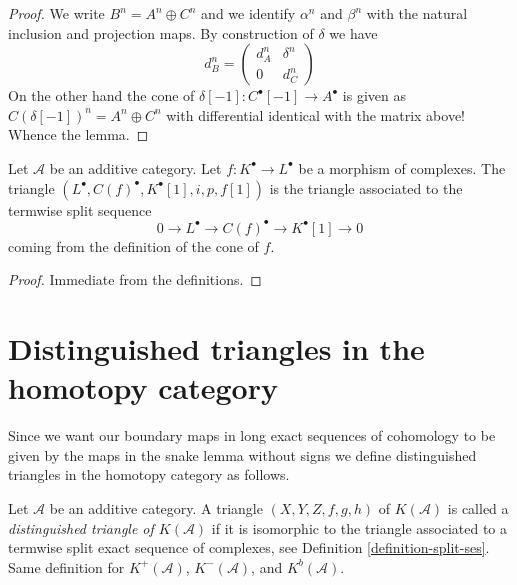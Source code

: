 \begin{proof}
We write $B^n = A^n \oplus C^n$ and we identify $\alpha^n$ and $\beta^n$
with the natural inclusion and projection maps. By construction of $\delta$ we
have
$$
d_B^n =
\left(
\begin{matrix}
d_A^n & \delta^n \\
0 & d_C^n
\end{matrix}
\right)
$$
On the other hand the cone of $\delta[-1] : C^\bullet[-1] \to A^\bullet$
is given as $C(\delta[-1])^n = A^n \oplus C^n$ with differential identical
with the matrix above! Whence the lemma.
\end{proof}

\begin{lemma}
\label{lemma-rotate-cone}
Let $\mathcal{A}$ be an additive category.
Let $f : K^\bullet \to L^\bullet$ be a morphism of complexes.
The triangle $(L^\bullet, C(f)^\bullet, K^\bullet[1], i, p, f[1])$ is
the triangle associated to the termwise split sequence
$$
0 \to L^\bullet \to C(f)^\bullet \to K^\bullet[1] \to 0
$$
coming from the definition of the cone of $f$.
\end{lemma}

\begin{proof}
Immediate from the definitions.
\end{proof}






\section{Distinguished triangles in the homotopy category}
\label{section-homotopy-triangulated}

\noindent
Since we want our boundary maps in long exact sequences of cohomology
to be given by the maps in the snake lemma without signs we define
distinguished triangles in the homotopy category as follows.

\begin{definition}
\label{definition-distinguished-triangle}
Let $\mathcal{A}$ be an additive category.
A triangle $(X, Y, Z, f, g, h)$ of $K(\mathcal{A})$ is
called a {\it distinguished triangle of $K(\mathcal{A})$}
if it is isomorphic to the triangle associated to
a termwise split exact sequence of complexes, see Definition
\ref{definition-split-ses}.
Same definition for $K^{+}(\mathcal{A})$, $K^{-}(\mathcal{A})$, and
$K^b(\mathcal{A})$.
\end{definition}

